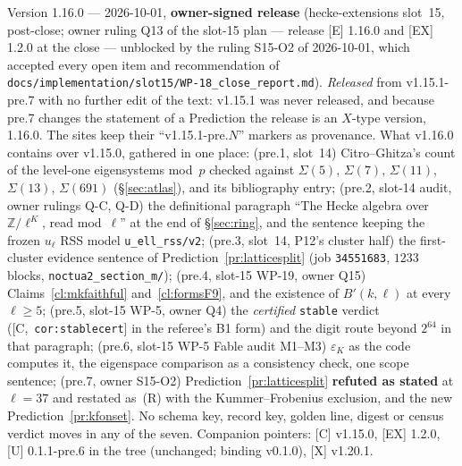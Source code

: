 \documentclass[11pt]{article}
\theoremstyle{remark}
\newcommand{\Z}{\mathbb{Z}}
\newcommand{\HA}[1]{[C,~\texttt{#1}]}      %
\begin{document}
Version 1.16.0 --- 2026-10-01, \textbf{owner-signed release} (hecke-extensions slot~15, post-close; owner ruling Q13 of the
slot-15 plan --- release [E] 1.16.0 and [EX] 1.2.0 at the close --- unblocked by the ruling S15-O2 of 2026-10-01, which accepted every open item
and recommendation of \texttt{docs/implementation/slot15/WP-18\_close\_report.md}). \emph{Released} from v1.15.1-pre.7 with no further edit of
the text: v1.15.1 was never released, and because pre.7 changes the statement of a Prediction the release is an $X$-type version, 1.16.0. The
sites keep their ``v1.15.1-pre.$N$'' markers as provenance. What v1.16.0 contains over v1.15.0, gathered in one place:
(pre.1, slot~14) Citro--Ghitza's count of the level-one eigensystems mod~$p$ checked against $\Sigma(5)$, $\Sigma(7)$, $\Sigma(11)$,
$\Sigma(13)$, $\Sigma(691)$ (\S\ref{sec:atlas}), and its bibliography entry;
(pre.2, slot-14 audit, owner rulings Q-C, Q-D) the definitional paragraph ``The Hecke algebra over $\Z/\ell^{K}$, read mod~$\ell$'' at the end of
\S\ref{sec:ring}, and the sentence keeping the frozen $u_\ell$ RSS model \texttt{u\_ell\_rss/v2};
(pre.3, slot~14, P12's cluster half) the first-cluster evidence sentence of Prediction~\ref{pr:latticesplit} (job \texttt{34551683}, $1233$ blocks,
\texttt{noctua2\_section\_m/});
(pre.4, slot-15 WP-19, owner Q15) Claims~\ref{cl:mkfaithful} and~\ref{cl:formsF9}, and the existence of $B'(k,\ell)$ at every $\ell\ge5$;
(pre.5, slot-15 WP-5, owner Q4) the \emph{certified} \texttt{stable} verdict (\HA{cor:stablecert} in the referee's B1 form) and the digit route
beyond $2^{64}$ in that paragraph;
(pre.6, slot-15 WP-5 Fable audit M1--M3) $\varepsilon_K$ as the code computes it, the eigenspace comparison as a consistency check, one scope
sentence;
(pre.7, owner S15-O2) Prediction~\ref{pr:latticesplit} \textbf{refuted as stated} at $\ell=37$ and restated as~(R) with the Kummer--Frobenius
exclusion, and the new Prediction~\ref{pr:kfonset}.
No schema key, record key, golden line, digest or census verdict moves in any of the seven. Companion pointers: [C] v1.15.0, [EX] 1.2.0,
[U] 0.1.1-pre.6 in the tree (unchanged; binding v0.1.0), [X] v1.20.1.
\end{document}
